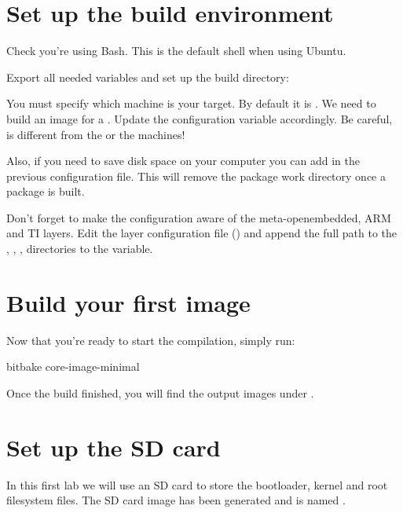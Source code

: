 \section{Set up the build environment}

Check you're using Bash. This is the default shell when using Ubuntu.

Export all needed variables and set up the build directory:

You must specify which machine is your target. By default it
is . We need to build an image for a .
Update the  configuration variable accordingly. Be
careful,  is different from the 
or the  machines!

Also, if you need to save disk space on your computer you can add  in the previous configuration file. This will remove the
package work directory once a package is built.

Don't forget to make the configuration aware of the meta-openembedded, ARM and TI layers. Edit the
layer configuration file () and append the
full path to the , , ,
 directories to the  variable.

\section{Build your first image}

Now that you're ready to start the compilation, simply run:
\begin{bashinput}
bitbake core-image-minimal
\end{bashinput}

Once the build finished, you will find the output images under
.

\section{Set up the SD card}

In this first lab we will use an SD card to store the bootloader, kernel and
root filesystem files. The SD card image has been generated and is
named .

